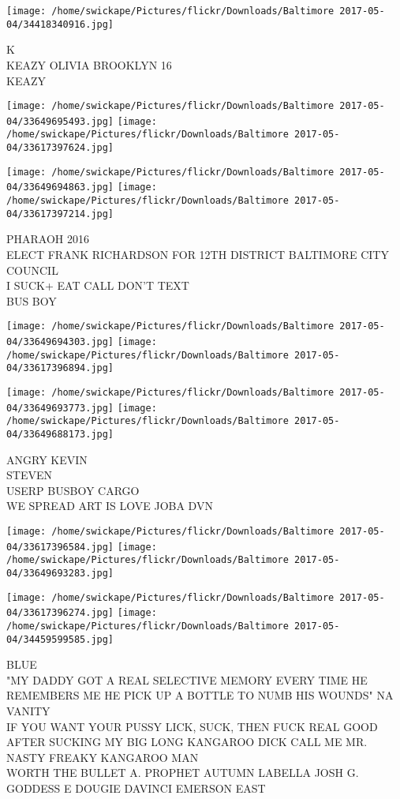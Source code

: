 \documentclass[10pt,letterpaper]{article}
\begin{document}
\vspace{0.25in}
\texttt{[image: /home/swickape/Pictures/flickr/Downloads/Baltimore 2017-05-04/34418340916.jpg]}

K\\
KEAZY OLIVIA BROOKLYN 16\\
KEAZY
\pagebreak

\texttt{[image: /home/swickape/Pictures/flickr/Downloads/Baltimore 2017-05-04/33649695493.jpg]}
\texttt{[image: /home/swickape/Pictures/flickr/Downloads/Baltimore 2017-05-04/33617397624.jpg]}

\texttt{[image: /home/swickape/Pictures/flickr/Downloads/Baltimore 2017-05-04/33649694863.jpg]}
\texttt{[image: /home/swickape/Pictures/flickr/Downloads/Baltimore 2017-05-04/33617397214.jpg]}

PHARAOH 2016\\
ELECT FRANK RICHARDSON FOR 12TH DISTRICT BALTIMORE CITY COUNCIL\\
I SUCK+ EAT CALL DON'T TEXT\\
BUS BOY
\pagebreak

\texttt{[image: /home/swickape/Pictures/flickr/Downloads/Baltimore 2017-05-04/33649694303.jpg]}
\texttt{[image: /home/swickape/Pictures/flickr/Downloads/Baltimore 2017-05-04/33617396894.jpg]}

\texttt{[image: /home/swickape/Pictures/flickr/Downloads/Baltimore 2017-05-04/33649693773.jpg]}
\texttt{[image: /home/swickape/Pictures/flickr/Downloads/Baltimore 2017-05-04/33649688173.jpg]}

ANGRY KEVIN\\
STEVEN\\
USERP BUSBOY CARGO\\
WE SPREAD ART IS LOVE JOBA DVN
\pagebreak

\texttt{[image: /home/swickape/Pictures/flickr/Downloads/Baltimore 2017-05-04/33617396584.jpg]}
\texttt{[image: /home/swickape/Pictures/flickr/Downloads/Baltimore 2017-05-04/33649693283.jpg]}

\texttt{[image: /home/swickape/Pictures/flickr/Downloads/Baltimore 2017-05-04/33617396274.jpg]}
\texttt{[image: /home/swickape/Pictures/flickr/Downloads/Baltimore 2017-05-04/34459599585.jpg]}

BLUE\\
"MY DADDY GOT A REAL SELECTIVE MEMORY EVERY TIME HE REMEMBERS ME HE PICK UP A BOTTLE TO NUMB HIS WOUNDS" NA VANITY\\
IF YOU WANT YOUR PUSSY LICK, SUCK, THEN FUCK REAL GOOD AFTER SUCKING MY BIG LONG KANGAROO DICK CALL ME MR. NASTY FREAKY KANGAROO MAN\\
WORTH THE BULLET A. PROPHET AUTUMN LABELLA JOSH G. GODDESS E DOUGIE DAVINCI EMERSON EAST
\pagebreak
\end{document}
